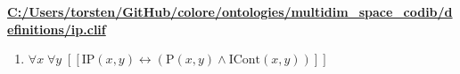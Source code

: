 \documentclass{article}
\begin{document}
\textbf{\url{C:/Users/torsten/GitHub/colore/ontologies/multidim\_space\_codib/definitions/ip.clif}}

\begin{enumerate}
\item $\forall x\; \forall y\;  \left[ \left[ \textrm{IP}(x,y) \leftrightarrow \left(\textrm{P}(x,y) \land \textrm{ICont}(x,y)\right) \right] \right]$
\end{enumerate}
\end{document}
